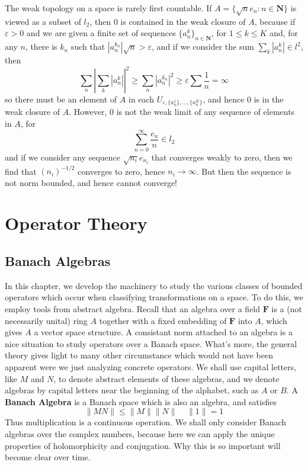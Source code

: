 \begin{example}
    The weak topology on a space is rarely first countable. If $A = \{ \sqrt{n} e_n : n \in \mathbf{N} \}$ is viewed as a subset of $l_2$, then 0 is contained in the weak closure of $A$, because if $\varepsilon > 0$ and we are given a finite set of sequences $\{ a_n^k \}_{n \in \mathbf{N}}$, for $1 \leq k \leq K$ and, for any $n$, there is $k_n$ such that $|a_n^{k_n}| \sqrt{n} > \varepsilon$, and if we consider the sum $\sum_k |a_n^k| \in l^2$, then
    \[ \sum_n \left|\sum_k |a_n^k| \right|^2 \geq \sum_n |a_n^{k_n}|^2 \geq \varepsilon \sum \frac{1}{n} = \infty \]
    so there must be an element of $A$ in each $U_{\varepsilon, \{ a_n^1 \}, \dots, \{ a_n^K \}}$, and hence $0$ is in the weak closure of $A$. However, 0 is not the weak limit of any sequence of elements in $A$, for
    \[ \sum_{n = 0}^\infty \frac{e_n}{n} \in l_2 \]
    and if we consider any sequence $\sqrt{n_i} e_{n_i}$ that converges weakly to zero, then we find that $(n_i)^{-1/2}$ converges to zero, hence $n_i \to \infty$. But then the sequence is not norm bounded, and hence cannot converge!
\end{example}










\part{Operator Theory}





\chapter{Banach Algebras}

In this chapter, we develop the machinery to study the various classes of bounded operators which occur when classifying transformations on a space. To do this, we employ tools from abstract algebra. Recall that an algebra over a field $\mathbf{F}$ is a (not necessarily unital) ring $A$ together with a fixed embedding of $\mathbf{F}$ into $A$, which gives $A$ a vector space structure. A consistant norm attached to an algebra is a nice situation to study operators over a Banach space. What's more, the general theory gives light to many other circumstance  which would not have been apparent were we just analyzing concrete operators. We shall use capital letters, like $M$ and $N$, to denote abstract elements of these algebras, and we denote algebras by capital letters near the beginning of the alphabet, such as $A$ or $B$. A {\bf Banach Algebra} is a Banach space which is also an algebra, and satisfies
%
\begin{equation} \label{algebranorm} \| MN \| \leq \| M \| \| N \|\ \ \ \ \ \| 1 \| = 1 \end{equation}
%
Thus multiplication is a continuous operation. We shall only consider Banach algebras over the complex numbers, because here we can apply the unique properties of holomorphicity and conjugation. Why this is so important will become clear over time.

